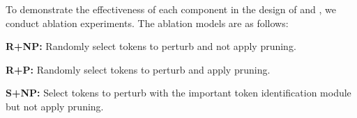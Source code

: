 \begin{table}[ht]
\centering
\renewcommand\arraystretch{1.4}
\caption{\textbf{Ablation study on the \attackname.}
The best result in each group is highlighted with a \colorbox{green!50}{green} background.}
\label{tab:ablation_study}

\end{table}


To demonstrate the effectiveness of each component in the design of  and \attackname, we conduct ablation experiments. 
The ablation models are as follows:

\noindent\textbf{R+NP:} Randomly select tokens to perturb and not apply pruning.

\noindent\textbf{R+P:} Randomly select tokens to perturb and apply pruning.

\noindent\textbf{S+NP:} Select tokens to perturb with the important token identification module but not apply pruning.

